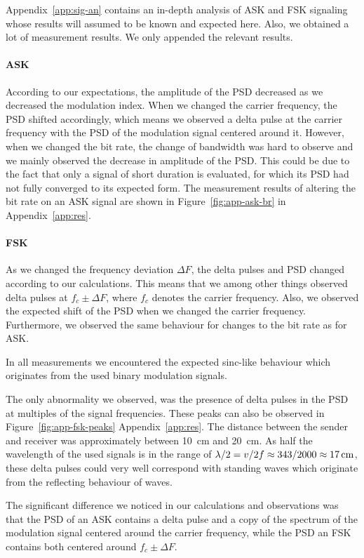 \documentclass[11pt,titlepage]{report}
\begin{document}
Appendix~\ref{app:sig-an} contains an in-depth analysis of ASK and FSK signaling whose results will assumed to be known and expected here. Also, we obtained a lot of measurement results. We only appended the relevant results.

\paragraph{ASK} According to our expectations, the amplitude of the PSD decreased as we decreased the modulation index. When we changed the carrier frequency, the PSD shifted accordingly, which means we observed a delta pulse at the carrier frequency with the PSD of the modulation signal centered around it. However, when we changed the bit rate, the change of bandwidth was hard to observe and we mainly observed the decrease in amplitude of the PSD. This could be due to the fact that only a signal of short duration is evaluated, for which its PSD had not fully converged to its expected form. The measurement results of altering the bit rate on an ASK signal are shown in Figure~\ref{fig:app-ask-br} in Appendix~\ref{app:res}.

\paragraph{FSK} As we changed the frequency deviation $\Delta F$, the delta pulses and PSD changed according to our calculations. This means that we among other things observed delta pulses at $f_c\pm \Delta F$, where $f_c$ denotes the carrier frequency. Also, we observed the expected shift of the PSD when we changed the carrier frequency. Furthermore, we observed the same behaviour for changes to the bit rate as for ASK.

In all measurements we encountered the expected sinc-like behaviour which originates from the used binary modulation signals.

The only abnormality we observed, was the presence of delta pulses in the PSD at multiples of the signal frequencies. These peaks can also be observed in Figure~\ref{fig:app-fsk-peaks} Appendix~\ref{app:res}. The distance between the sender and receiver was approximately between \SI{10}{cm} and \SI{20}{cm}. As half the wavelength of the used signals is in the range of $\lambda/2=v/2f\approx 343/2000\approx\text{\SI{17}{cm}}$, these delta pulses could very well correspond with standing waves which originate from the reflecting behaviour of waves.

The significant difference we noticed in our calculations and observations was that the PSD of an ASK contains a delta pulse and a copy of the spectrum of the modulation signal centered around the carrier frequency, while the PSD an FSK contains both centered around $f_c\pm \Delta F$.
\end{document}
